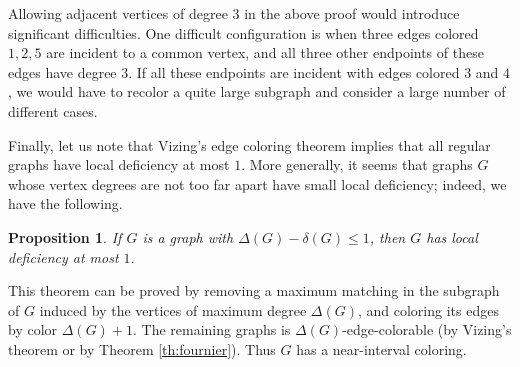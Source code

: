 \documentclass[12pt]{article}
\theoremstyle{plain}
\newtheorem{proposition}[theorem]{Proposition}
\theoremstyle{definition}
\numberwithin{equation}{section}
\begin{document}
	Allowing adjacent vertices of degree $3$ in the above proof would introduce significant
	difficulties. One difficult configuration is when three edges colored $1,2,5$ are incident
	to a common vertex, and all three other endpoints of these edges have degree $3$.
	If all these endpoints are incident with edges colored $3$ and $4$, we would have to
	recolor a quite large subgraph and consider a large number of different cases.

Finally, let us note that Vizing's edge coloring theorem implies that all regular graphs have local deficiency at most $1$.
More generally, it seems that graphs $G$ whose vertex degrees are not too far apart have small local deficiency; indeed, we have the following.

\begin{proposition}
\label{th:D-d<=1}
If $G$ is a graph with $\Delta(G)-\delta(G)\leq 1$, then $G$ has  local deficiency at most $1$.	
\end{proposition}
This theorem can be proved by removing a maximum matching in the subgraph of $G$ induced by the vertices of maximum degree $\Delta(G)$,
and coloring its edges by color $\Delta(G)+1$.
The remaining graphs is $\Delta(G)$-edge-colorable (by Vizing's theorem or by Theorem \ref{th:fournier}). Thus $G$ has a near-interval coloring.




%
\end{document}
